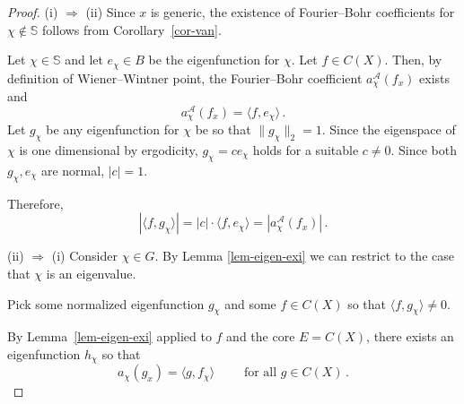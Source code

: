 \documentclass[10pt,a4paper]{amsart}
\newcommand{\CC}{{\mathbb C}}
\newcommand{\SSS}{\mathbb S}
\newcommand{\cA}{{\mathcal A}}
\newcommand{\dd}{\mbox{\rm d}}
\begin{document}
\begin{proof}
\noindent (i) $\Longrightarrow$ (ii) Since $x$ is generic, the existence of Fourier--Bohr coefficients for $\chi \notin \SSS$ follows from Corollary~\ref{cor-van}.


Let $\chi \in \SSS$ and let $e_\chi \in B$ be the eigenfunction for $\chi$. Let $f \in C(X)$. Then, by definition of Wiener--Wintner point, the Fourier--Bohr coefficient $a^\cA_{\chi}(f_x)$ exists and
\[
a^\cA_\chi(f_x)=\langle f, e_\chi\rangle \,.
\]
Let $g_\chi$ be any eigenfunction for $\chi$ be so that $\| g_\chi \|_2=1$. Since the eigenspace of $\chi$ is one dimensional by ergodicity, $g_\chi=c e_\chi$ holds for a suitable $c\neq 0$. Since both $g_\chi, e_\chi$ are normal, $|c|=1$.

Therefore,
\[
|\langle f, g_\chi \rangle|=|c| \cdot \langle f, e_\chi \rangle= |a^\cA_\chi(f_x)| \,.
\]



\smallskip

\noindent (ii) $\Longrightarrow$ (i)
Consider $\chi \in\widehat{G}$.  By Lemma \ref{lem-eigen-exi} we can restrict to the case that $\chi $ is an eigenvalue.

Pick some normalized eigenfunction $g_\chi$ and some $f \in C(X)$ so that $\langle f, g_\chi \rangle \neq 0$.

By Lemma~\ref{lem-eigen-exi} applied to $f$ and the core $E=C(X)$, there exists an eigenfunction $h_\chi$ so that
\[
a_\chi(g_x)= \langle g, f_\chi \rangle \qquad \mbox{ for all } g \in C(X) \,.
\]



\end{proof}
\end{document}
